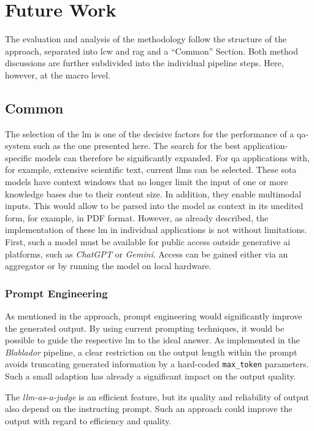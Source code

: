 \chapter{Future Work}\label{ch:futurework}
The evaluation and analysis of the methodology follow the structure of the approach, separated into \ac{lcw} and \ac{rag} and a \enquote{Common} Section.
Both method discussions are further subdivided into the individual pipeline steps.
Here, however, at the macro level.
%
\section{Common}

The selection of the \ac{lm} is one of the decisive factors for the performance of a \ac{qa}-system such as the one presented here.
The search for the best application-specific models can therefore be significantly expanded.
For \ac{qa} applications with, for example, extensive scientific text, current \acp{llm} can be selected.
These \ac{sota} models have context windows that no longer limit the input of one or more knowledge bases due to their content size.
In addition, they enable multimodal inputs.
This would allow \cite{bb2} to be parsed into the model as context in its unedited form, for example, in PDF format.
However, as already described, the implementation of these \ac{lm} in individual applications is not without limitations.
First, such a model must be available for public access outside generative \ac{ai} platforms, such as \textit{ChatGPT} or \textit{Gemini}.
Access can be gained either via an aggregator or by running the model on local hardware.

%
\subsection{Prompt Engineering}\label{sub:prompt_engineering}
As mentioned in the approach, prompt engineering would significantly improve the generated output.
By using current prompting techniques, it would be possible to guide the respective \ac{lm} to the ideal answer.
As implemented in the \textit{Blablador} pipeline, a clear restriction on the output length within the prompt avoids truncating generated information by a hard-coded \texttt{max\_token} parameters.
Such a small adaption has already a significant impact on the output quality.

The \textit{llm-as-a-judge} is an efficient feature, but its quality and reliability of output also depend on the instructing prompt.
Such an approach could improve the output with regard to efficiency and quality.

